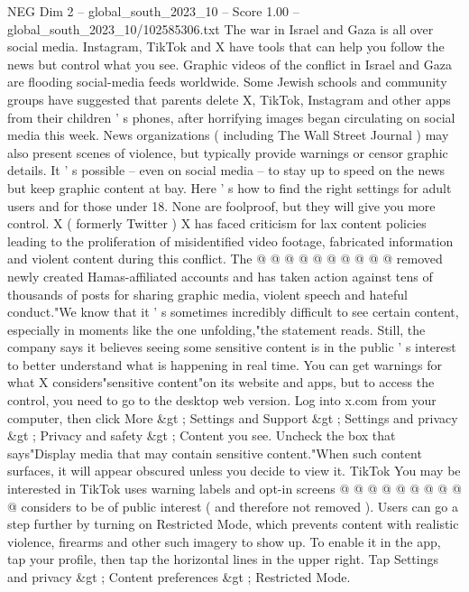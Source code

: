\begin{textsample}{NEG Dim 2 – global\_south\_2023\_10 – Score 1.00 – global\_south\_2023\_10/102585306.txt}  \label{ex:f2_neg_277}
The war in Israel and Gaza is all over social media.
Instagram, TikTok and X have tools that can help you follow the news but control what you see.
Graphic videos of the conflict in Israel and Gaza are flooding social-media feeds worldwide.
Some Jewish schools and community groups have suggested that parents delete X, TikTok, Instagram and other apps from their children ' s phones, after horrifying images began circulating on social media this week.
News organizations ( including The Wall Street Journal ) may also present scenes of violence, but typically provide warnings or censor graphic details.
It ' s possible -- even on social media -- to stay up to speed on the news but keep graphic content at bay.
Here ' s how to find the right settings for adult users and for those under 18.
None are foolproof, but they will give you more control.
X ( formerly Twitter ) X has faced criticism for lax content policies leading to the proliferation of misidentified video footage, fabricated information and violent content during this conflict.
The @ @ @ @ @ @ @ @ @ @ removed newly created Hamas-affiliated accounts and has taken action against tens of thousands of posts for sharing graphic media, violent speech and hateful conduct."We know that it ' s sometimes incredibly difficult to see certain content, especially in moments like the one unfolding,"the statement reads.
Still, the company says it believes seeing some sensitive content is in the public ' s interest to better understand what is happening in real time.
You can get warnings for what X considers"sensitive content"on its website and apps, but to access the control, you need to go to the desktop web version.
Log into x.com from your computer, then click More \&gt ; Settings and Support \&gt ; Settings and privacy \&gt ; Privacy and safety \&gt ; Content you see.
Uncheck the box that says"Display media that may contain sensitive content."When such content surfaces, it will appear obscured unless you decide to view it.
TikTok You may be interested in TikTok uses warning labels and opt-in screens @ @ @ @ @ @ @ @ @ @ considers to be of public interest ( and therefore not removed ).
Users can go a step further by turning on Restricted Mode, which prevents content with realistic violence, firearms and other such imagery to show up.
To enable it in the app, tap your profile, then tap the horizontal lines in the upper right.
Tap Settings and privacy \&gt ; Content preferences \&gt ; Restricted Mode.

\end{textsample}
